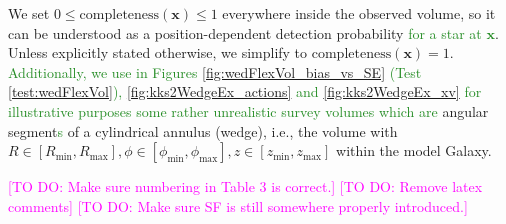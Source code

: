 \documentclass[iop,revtex4]{emulateapj}
\newcommand{\vect}[1]{\boldsymbol{#1}}
\newcommand{\NEW}[1]{\textcolor{ForestGreen}{#1}}
\newcommand{\Wilma}[1]{\textcolor{Magenta}{#1}}
\newcommand{\OLD}[1]{}
\begin{document}
\begin{appendix}
\OLD{The SF of the SEGUE survey \citep{2012ApJ...753..148B} used by BR13 consists of many pencil-beams. In anticipation of large contiguous volume surveys like Gaia, we use SFs that span large observed volumes of simple geometrical shapes: a sphere of radius $r_\text{max}$ with the Sun at its center; or an angular segment of an cylindrical annulus (wedge), i.e., the volume with $R \in [R_\text{min},R_\text{max}],\phi \in [\phi_\text{min},\phi_\text{max}],z \in [z_\text{min},z_\text{max}]$ within the model Galaxy. The sharp outer edge of the survey volume could be interpreted as a detection limit in apparent brightness in the case where all stars have the same luminosity.} We set $0 \leq \text{completeness}(\vect{x}) \leq 1$ everywhere inside the observed volume, so it can be understood as a position-dependent detection probability \NEW{for a star at $\vect{x}$}. Unless explicitly stated otherwise, we simplify to $\text{completeness}(\vect{x}) = 1$. \NEW{Additionally, we use in Figures \ref{fig:wedFlexVol_bias_vs_SE} (Test \ref{test:wedFlexVol}), \ref{fig:kks2WedgeEx_actions} and \ref{fig:kks2WedgeEx_xv} for illustrative purposes some rather unrealistic survey volumes which are} angular segment\NEW{s} of a cylindrical annulus (wedge), i.e., the volume with $R \in [R_\text{min},R_\text{max}],\phi \in [\phi_\text{min},\phi_\text{max}],z \in [z_\text{min},z_\text{max}]$ within the model Galaxy. 


\end{appendix}

\Wilma{[TO DO: Make sure numbering in Table 3 is correct.]}
\Wilma{[TO DO: Remove latex comments]}
\Wilma{[TO DO: Make sure SF is still somewhere properly introduced.]}
\end{document}
